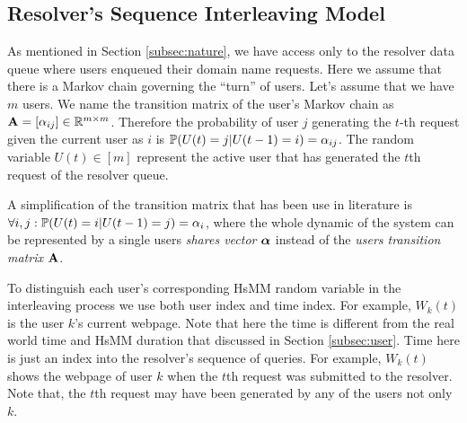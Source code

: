 \documentclass[conference]{IEEEtran}
\begin{document}
	\subsection{Resolver's Sequence Interleaving Model}
	\label{subsec:interle}
	As mentioned in Section \ref{subsec:nature}, we have access only to the resolver data queue where users enqueued their domain name requests. 
	Here we assume that there is a Markov chain governing the ``turn'' of users. 
	Let's assume that we have $m$ users.
	We name the transition matrix of the user's Markov chain as $\mathbf{A} = [\alpha_{ij}] \in \mathbb R^{m \times m}$.
	Therefore the probability of user $j$ generating the $t$-th request given the current user as $i$ is $\mathbb{P}(U(t)=j|U(t-1)=i) = \alpha_{ij}$.
	The random variable $U(t) \in [m]$ represent the active user that has generated the $t$th request of the resolver queue. 
	
	A simplification of the transition matrix that has been use in literature is $\forall i, j: \mathbb{P}(U(t) = i|U(t-1) = j) = \alpha_i$, where the whole dynamic of the system can be represented by a single users \emph{shares vector} $\boldsymbol{\alpha}$ instead of the \emph{users transition matrix} $\mathbf{A}$.
	
	To distinguish each user's corresponding HsMM random variable in the interleaving process we use both user index and time index. For example, $W_{k}(t)$ is the user $k$'s current webpage. 
	Note that here the time is different from the real world time and HsMM duration that discussed in Section \ref{subsec:user}. 
	Time here is just an index into the resolver's sequence of queries.
	For example, $W_{k}(t)$ shows the webpage of user $k$ when the $t$th request was submitted to the resolver. 
	Note that, the $t$th request may have been generated by any of the users not only $k$. 
	
\end{document}
